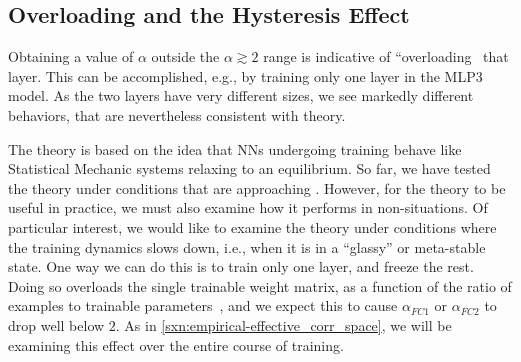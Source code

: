 
\subsection{Overloading and the Hysteresis Effect}
\label{sxn:hysteresis_effect}


Obtaining a value of $\alpha$ outside the $\alpha \gtrsim 2$ range is indicative of ``overloading~\cite{SST92} that layer. 
This can be accomplished, e.g., by training only one layer in the MLP3 model.
As the two layers have very different sizes, we see markedly different behaviors, that are nevertheless consistent with theory.

The \SETOL theory is based on the idea that NNs undergoing training behave like Statistical Mechanic systems relaxing to an equilibrium. 
So far, we have tested the theory under conditions that are approaching \Ideal. 
However, for the theory to be useful in practice, we must also examine how it performs in non-\Ideal situations. 
Of particular interest, we would like to examine the theory under conditions where the training dynamics slows down, i.e., when it is in a ``glassy''
or meta-stable state. 
One way we can do this is to train only one layer, and freeze the rest. 
Doing so overloads the single trainable weight matrix, as a function of the ratio of examples to trainable
parameters~\cite{SST92,Gardner_1988,MM17_TR}, and we expect this to cause $\alpha_{FC1}$ or $\alpha_{FC2}$ to drop well below $2$. As in \ref{sxn:empirical-effective_corr_space}, we will be examining this effect over the entire course of training.


